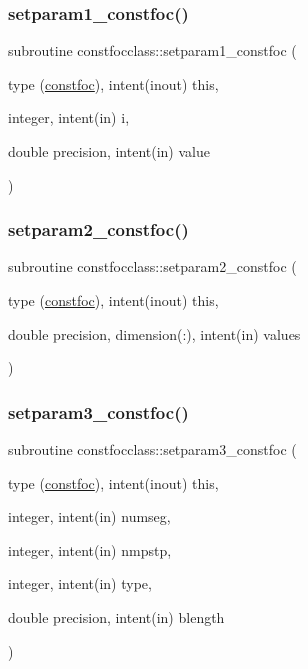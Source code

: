\subsubsection{\texorpdfstring{setparam1\_constfoc()}{setparam1\_constfoc()}}
{\footnotesize\ttfamily subroutine constfocclass\+::setparam1\+\_\+constfoc (\begin{DoxyParamCaption}\item[{type (\mbox{\hyperlink{namespaceconstfocclass_structconstfocclass_1_1constfoc}{constfoc}}), intent(inout)}]{this,  }\item[{integer, intent(in)}]{i,  }\item[{double precision, intent(in)}]{value }\end{DoxyParamCaption})}

\mbox{\label{namespaceconstfocclass_a36ac221c9fb8e90f23b97b10cc272775}} 
\subsubsection{\texorpdfstring{setparam2\_constfoc()}{setparam2\_constfoc()}}
{\footnotesize\ttfamily subroutine constfocclass\+::setparam2\+\_\+constfoc (\begin{DoxyParamCaption}\item[{type (\mbox{\hyperlink{namespaceconstfocclass_structconstfocclass_1_1constfoc}{constfoc}}), intent(inout)}]{this,  }\item[{double precision, dimension(\+:), intent(in)}]{values }\end{DoxyParamCaption})}

\mbox{\label{namespaceconstfocclass_a9d02ddbf03689cdd653805ca5a56856e}} 
\subsubsection{\texorpdfstring{setparam3\_constfoc()}{setparam3\_constfoc()}}
{\footnotesize\ttfamily subroutine constfocclass\+::setparam3\+\_\+constfoc (\begin{DoxyParamCaption}\item[{type (\mbox{\hyperlink{namespaceconstfocclass_structconstfocclass_1_1constfoc}{constfoc}}), intent(inout)}]{this,  }\item[{integer, intent(in)}]{numseg,  }\item[{integer, intent(in)}]{nmpstp,  }\item[{integer, intent(in)}]{type,  }\item[{double precision, intent(in)}]{blength }\end{DoxyParamCaption})}



